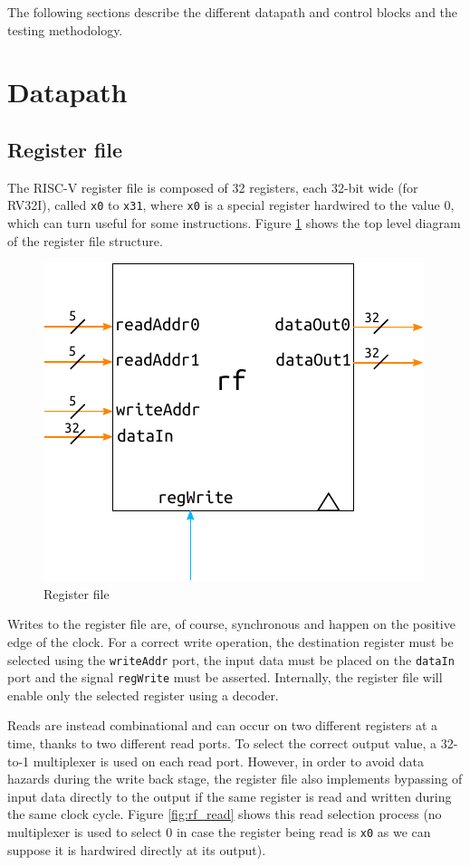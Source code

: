 \documentclass[a4paper]{article}
\begin{document}
The following sections describe the different datapath and control blocks and the testing methodology.

\section{Datapath}
\subsection{Register file}
The RISC-V register file is composed of 32 registers, each 32-bit wide (for RV32I), called \texttt{x0} to \texttt{x31}, where \texttt{x0} is a special register hardwired to the value 0, which can turn useful for some instructions. Figure \ref{fig:rf} shows the top level diagram of the register file structure.

\begin{figure}[hbtp]
    \centering
    \includegraphics[scale=1]{../register_file/ref/schematic/register_file.pdf}
    \caption{Register file}
    \label{fig:rf}
\end{figure}

Writes to the register file are, of course, synchronous and happen on the positive edge of the clock. For a correct write operation, the destination register must be selected using the \texttt{writeAddr} port, the input data must be placed on the \texttt{dataIn} port and the signal \texttt{regWrite} must be asserted. Internally, the register file will enable only the selected register using a decoder.

Reads are instead combinational and can occur on two different registers at a time, thanks to two different read ports. To select the correct output value, a 32-to-1 multiplexer is used on each read port. However, in order to avoid data hazards during the write back stage, the register file also implements bypassing of input data directly to the output if the same register is read and written during the same clock cycle. Figure \ref{fig:rf_read} shows this read selection process (no multiplexer is used to select 0 in case the register being read is \texttt{x0} as we can suppose it is hardwired directly at its output).
\end{document}
